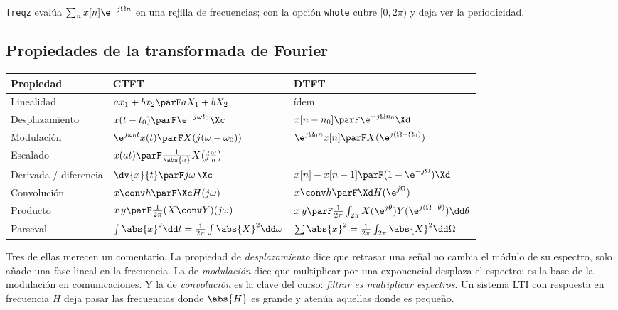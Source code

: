\documentclass[11pt,a4paper]{scrartcl}
\begin{document}
\begin{encodigo}
  \texttt{freqz} evalúa $\sum_n x[n]\e^{-j\Omega n}$ en una rejilla de frecuencias; con la opción \texttt{whole} cubre $[0,2\pi)$ y deja ver la periodicidad.
\end{encodigo}

\subsection{Propiedades de la transformada de Fourier}

\begin{center}
  \small
  \renewcommand{\arraystretch}{1.35}
  \begin{tabular}{@{}lll@{}}
    \toprule
    Propiedad & CTFT & DTFT\\\midrule
    Linealidad & $a x_1+b x_2\parF aX_1+bX_2$ & ídem\\
    Desplazamiento & $x(t-t_0)\parF\e^{-j\omega t_0}\Xc$ & $x[n-n_0]\parF\e^{-j\Omega n_0}\Xd$\\
    Modulación & $\e^{j\omega_0t}x(t)\parF X(j(\omega-\omega_0))$ & $\e^{j\Omega_0n}x[n]\parF X(\e^{j(\Omega-\Omega_0)})$\\
    Escalado & $x(at)\parF\frac{1}{\abs{a}}X\big(j\tfrac{\omega}{a}\big)$ & —\\
    Derivada / diferencia & $\dv{x}{t}\parF j\omega\,\Xc$ & $x[n]-x[n-1]\parF(1-\e^{-j\Omega})\Xd$\\
    Convolución & $x\conv h\parF\Xc H(j\omega)$ & $x\conv h\parF\Xd H(\e^{j\Omega})$\\
    Producto & $x\,y\parF\frac{1}{2\pi}(X\conv Y)(j\omega)$ & $x\,y\parF\frac{1}{2\pi}\int_{2\pi}X(\e^{j\theta})Y(\e^{j(\Omega-\theta)})\dd\theta$\\
    Parseval & $\int\abs{x}^2\dd t=\frac{1}{2\pi}\int\abs{X}^2\dd\omega$ & $\sum\abs{x}^2=\frac{1}{2\pi}\int_{2\pi}\abs{X}^2\dd\Omega$\\\bottomrule
  \end{tabular}
\end{center}

Tres de ellas merecen un comentario. La propiedad de \emph{desplazamiento} dice que retrasar una señal no cambia el módulo de su espectro, solo añade una fase lineal en la frecuencia. La de \emph{modulación} dice que multiplicar por una exponencial desplaza el espectro: es la base de la modulación en comunicaciones. Y la de \emph{convolución} es la clave del curso: \emph{filtrar es multiplicar espectros}. Un sistema LTI con respuesta en frecuencia $H$ deja pasar las frecuencias donde $\abs{H}$ es grande y atenúa aquellas donde es pequeño.
\end{document}

